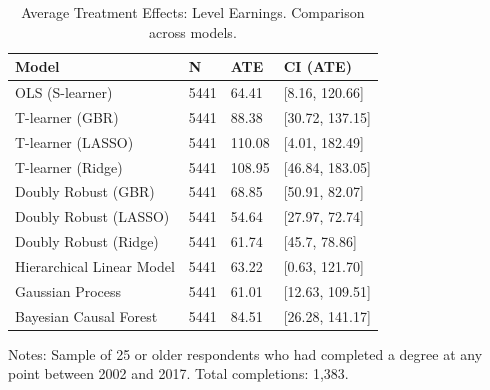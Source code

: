 \documentclass[12pt, a4paper]{article}
\begin{document}
\singlespacing
\begin{table}[htbp]
\centering
\small
\caption{Average Treatment Effects: Level Earnings. Comparison across models.}
\begin{tabular}{p{} C{0.1\textwidth} C{0.1\textwidth} C{0.2\textwidth}}
\toprule
Model  &  N  &  ATE  &  CI (ATE)  \\
\midrule 	   						
OLS (S-learner)	 & 	5441	 & 	64.41	 & 	[8.16, 120.66]	 \\
T-learner (GBR)	 & 	5441	 & 	88.38	 & 	[30.72, 137.15]	 \\
T-learner (LASSO)	 & 	5441	 & 	110.08	 & 	[4.01, 182.49]	 \\
T-learner (Ridge)	 & 	5441	 & 	108.95	 & 	[46.84, 183.05]	 \\
Doubly Robust (GBR)	 & 	5441	 & 	68.85	 & [50.91, 82.07] \\
Doubly Robust (LASSO)	 & 	5441	 & 	54.64	 & 	[27.97, 72.74]	 \\
Doubly Robust (Ridge)	 & 	5441	 & 	61.74	 & 	[45.7, 78.86]	 \\
Hierarchical Linear Model	 & 	5441	 & 	63.22 & [0.63, 121.70]  \\
Gaussian Process  & 	5441	 & 	61.01	 & 	[12.63, 109.51]	 \\
Bayesian Causal Forest & 5441 & 84.51 & [26.28, 141.17] \\
\bottomrule
\end{tabular}
\par\medskip
\parbox{1.0\textwidth}{\footnotesize Notes: Sample of 25 or older respondents who had completed a degree at any point between 2002 and 2017. Total completions: 1,383.}
\label{tab:atebslvl}
\end{table}
\doublespacing

\end{document}

